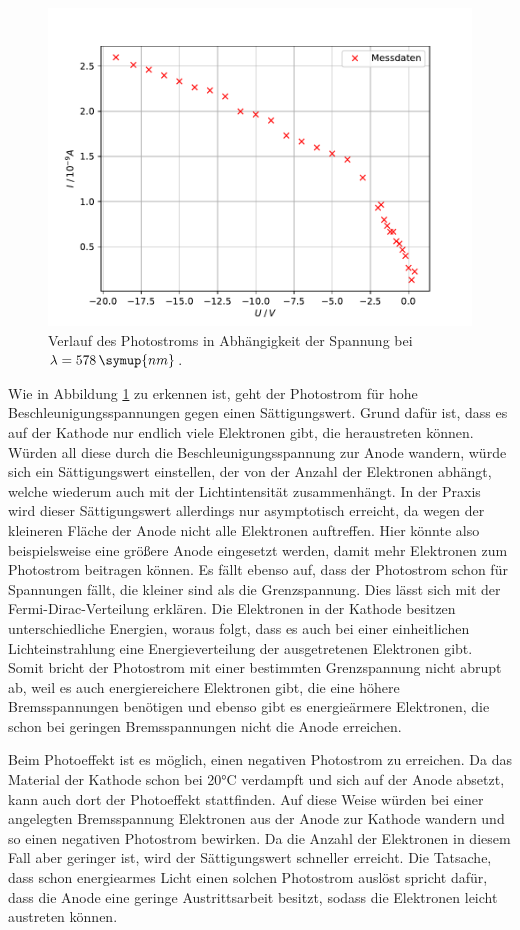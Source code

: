 \begin{figure}[h!tbp]
	\centering
	\includegraphics[width=0.8\linewidth]{orangePhoto.pdf}
	\caption{Verlauf des Photostroms in Abhängigkeit der Spannung bei $\lambda = 578\,\symup{nm}$.}
	\label{fig:orangePhoto}
\end{figure}
Wie in Abbildung \ref{fig:orangePhoto} zu erkennen ist, geht der Photostrom für hohe Beschleunigungsspannungen gegen einen Sättigungswert. Grund dafür ist, dass es auf der Kathode nur endlich viele Elektronen gibt, die heraustreten können.
Würden all diese durch die Beschleunigungsspannung zur Anode wandern, würde sich ein Sättigungswert einstellen, der von der Anzahl der Elektronen abhängt, welche wiederum auch mit der Lichtintensität zusammenhängt. In der Praxis wird dieser Sättigungswert 
allerdings nur asymptotisch erreicht, da wegen der kleineren Fläche der Anode nicht alle Elektronen auftreffen. Hier könnte also beispielsweise eine größere Anode eingesetzt werden, damit mehr Elektronen zum Photostrom beitragen können.
Es fällt ebenso auf, dass der Photostrom schon für Spannungen fällt, die kleiner sind als die Grenzspannung. Dies lässt sich mit der Fermi-Dirac-Verteilung erklären. Die Elektronen in der Kathode besitzen unterschiedliche Energien, woraus folgt, dass 
es auch bei einer einheitlichen Lichteinstrahlung eine Energieverteilung der ausgetretenen Elektronen gibt. Somit bricht der Photostrom mit einer bestimmten Grenzspannung nicht abrupt ab, weil es auch energiereichere Elektronen gibt, die eine höhere 
Bremsspannungen benötigen und ebenso gibt es energieärmere Elektronen, die schon bei geringen Bremsspannungen nicht die Anode erreichen.

Beim Photoeffekt ist es möglich, einen negativen Photostrom zu erreichen. Da das Material der Kathode schon bei 20°C verdampft und sich auf der Anode absetzt, kann auch dort der Photoeffekt stattfinden. Auf diese Weise würden bei einer angelegten 
Bremsspannung Elektronen aus der Anode zur Kathode wandern und so einen negativen Photostrom bewirken. Da die Anzahl der Elektronen in diesem Fall aber geringer ist, wird der Sättigungswert schneller erreicht. Die Tatsache, dass schon energiearmes Licht 
einen solchen Photostrom auslöst spricht dafür, dass die Anode eine geringe Austrittsarbeit besitzt, sodass die Elektronen leicht austreten können.
